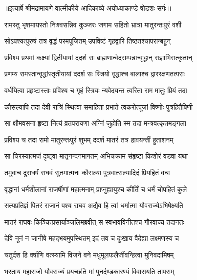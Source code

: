 {॥इत्यार्षे श्रीमद्रामायणे वाल्मीकीये आदिकाव्ये अयोध्याकाण्डे षोडशः सर्गः॥}


\twolineshloka
{रामस्तु भृशमायस्तो निःश्वसन्निव कुञ्जरः}
{जगाम सहितो भ्रात्रा मातुरन्तःपुरं वशी} %

\twolineshloka
{सोऽपश्यत्पुरुषं तत्र वृद्धं परमपूजितम्}
{उपविष्टं गृहद्वारि तिष्ठतश्चापरान्बहून्} %

\twolineshloka
{प्रविश्य प्रथमां कक्ष्यां द्वितीयायां ददर्श सः}
{ब्राह्मणान्वेदसम्पन्नान्वृद्धान् राज्ञाभिसत्कृतान्} %

\twolineshloka
{प्रणम्य रामस्तान्वृद्धांस्तृतीयायां ददर्श सः}
{स्त्रियो वृद्धाश्च बालाश्च द्वाररक्षणतत्पराः} %

\twolineshloka
{वर्धयित्वा प्रहृष्टास्ताः प्रविश्य च गृहं स्त्रियः}
{न्यवेदयन्त त्वरिता राम मातुः प्रियं तदा} %

\twolineshloka
{कौसल्यापि तदा देवी रात्रिं स्थित्वा समाहिता}
{प्रभाते त्वकरोत्पूजां विष्णोः पुत्रहितैषिणी} %

\twolineshloka
{सा क्षौमवसना हृष्टा नित्यं व्रतपरायणा}
{अग्निं जुहोति स्म तदा मन्त्रवत्कृतमङ्गला} %

\twolineshloka
{प्रविश्य च तदा रामो मातुरन्तःपुरं शुभम्}
{ददर्श मातरं तत्र हावयन्तीं हुताशनम्} %

\twolineshloka
{सा चिरस्यात्मजं दृष्ट्वा मातृनन्दनमागतम्}
{अभिचक्राम संहृष्टा किशोरं वडवा यथा} %

\twolineshloka
{तमुवाच दुराधर्षं राघवं सुतमात्मनः}
{कौसल्या पुत्रवात्सल्यादिदं प्रियहितं वचः} %

\twolineshloka
{वृद्धानां धर्मशीलानां राजर्षीणां महात्मनाम्}
{प्राप्नुह्यायुश्च कीर्तिं च धर्मं चोपहितं कुले} %

\twolineshloka
{सत्यप्रतिज्ञं पितरं राजानं पश्य राघव}
{अद्यैव हि त्वां धर्मात्मा यौवराज्येऽभिषेक्ष्यति} %

\twolineshloka
{मातरं राघवः किञ्चित्प्रसार्याञ्जलिमब्रवीत्}
{स स्वभावविनीतश्च गौरवाच्च तदानतः} %

\twolineshloka
{देवि नूनं न जानीषे महद्भयमुपस्थितम्}
{इदं तव च दुःखाय वैदेह्या लक्ष्मणस्य च} %

\twolineshloka
{चतुर्दश हि वर्षाणि वत्स्यामि विजने वने}
{मधुमूलफलैर्जीवन्हित्वा मुनिवदामिषम्} %

\twolineshloka
{भरताय महाराजो यौवराज्यं प्रयच्छति}
{मां पुनर्दण्डकारण्यं विवासयति तापसम्} %

